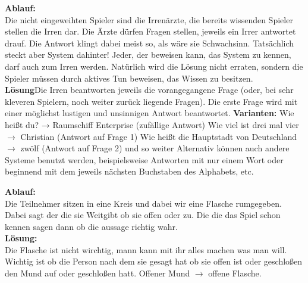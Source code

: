 \textbf{Ablauf:}\\Die nicht eingeweihten Spieler sind die Irrenärzte, die bereits wissenden Spieler stellen die Irren dar. Die Ärzte dürfen Fragen stellen, jeweils ein Irrer antwortet drauf. Die Antwort klingt dabei meist so, als wäre sie Schwachsinn. Tatsächlich steckt aber System dahinter! Jeder, der beweisen kann, das System zu kennen, darf auch zum Irren werden. Natürlich wird die Lösung nicht erraten, sondern die Spieler müssen durch aktives Tun beweisen, das Wissen zu besitzen.\\
\textbf{Lösung}Die Irren beantworten jeweils die vorangegangene Frage (oder, bei sehr kleveren Spielern, noch weiter zurück liegende Fragen). Die erste Frage wird mit einer möglichst lustigen und unsinnigen Antwort beantwortet. \newline
\textbf{Varianten:}
Wie heißt du? → Raumschiff Enterprise (zufällige Antwort) \newline
Wie viel ist drei mal vier $\rightarrow$ Christian (Antwort auf Frage 1) \newline
Wie heißt die Hauptstadt von Deutschland $\rightarrow$ zwölf (Antwort auf Frage 2) \newline
und so weiter \newline
Alternativ können auch andere Systeme benutzt werden, beispielsweise Antworten mit nur einem Wort oder beginnend mit dem jeweils nächsten Buchstaben des Alphabets, etc.





    \textbf{Ablauf:}\\Die Teilnehmer sitzen in eine Kreis und dabei wir eine Flasche rumgegeben. Dabei sagt der die sie Weitgibt ob sie offen oder zu. Die die das Spiel schon kennen sagen dann ob die aussage richtig wahr.  \\
   \textbf{Lösung:}\\Die Flasche ist nicht wirchtig, mann kann mit ihr alles machen was man will. Wichtig ist ob die Person nach dem sie gesagt hat ob sie offen ist oder geschloßen den Mund auf oder geschloßen hatt. Offener Mund $\rightarrow$ offene Flasche.\\



